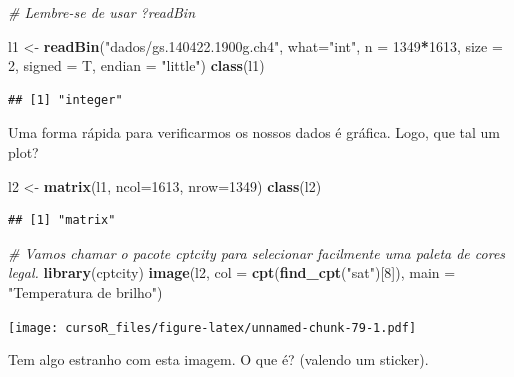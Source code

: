 \documentclass[]{book}
\newenvironment{Shaded}{\begin{snugshade}}{\end{snugshade}}
\newcommand{\KeywordTok}[1]{\textcolor[rgb]{0.13,0.29,0.53}{\textbf{#1}}}
\newcommand{\DataTypeTok}[1]{\textcolor[rgb]{0.13,0.29,0.53}{#1}}
\newcommand{\DecValTok}[1]{\textcolor[rgb]{0.00,0.00,0.81}{#1}}
\newcommand{\StringTok}[1]{\textcolor[rgb]{0.31,0.60,0.02}{#1}}
\newcommand{\CommentTok}[1]{\textcolor[rgb]{0.56,0.35,0.01}{\textit{#1}}}
\newcommand{\OperatorTok}[1]{\textcolor[rgb]{0.81,0.36,0.00}{\textbf{#1}}}
\newcommand{\NormalTok}[1]{#1}
\theoremstyle{definition}
\theoremstyle{definition}
\theoremstyle{definition}
\theoremstyle{remark}
\begin{document}
\begin{Shaded}
\begin{Highlighting}[]
\CommentTok{# Lembre-se de usar ?readBin}

\NormalTok{l1 <-}\StringTok{ }\KeywordTok{readBin}\NormalTok{(}\StringTok{"dados/gs.140422.1900g.ch4"}\NormalTok{, }
              \DataTypeTok{what=}\StringTok{"int"}\NormalTok{, }
              \DataTypeTok{n =} \DecValTok{1349}\OperatorTok{*}\DecValTok{1613}\NormalTok{,}
              \DataTypeTok{size =} \DecValTok{2}\NormalTok{,}
              \DataTypeTok{signed =}\NormalTok{ T,}
              \DataTypeTok{endian =} \StringTok{"little"}\NormalTok{)}
\KeywordTok{class}\NormalTok{(l1)}
\end{Highlighting}
\end{Shaded}

\begin{verbatim}
## [1] "integer"
\end{verbatim}

Uma forma rápida para verificarmos os nossos dados é gráfica. Logo, que
tal um plot?

\begin{Shaded}
\begin{Highlighting}[]
\NormalTok{l2 <-}\StringTok{ }\KeywordTok{matrix}\NormalTok{(l1, }\DataTypeTok{ncol=}\DecValTok{1613}\NormalTok{, }\DataTypeTok{nrow=}\DecValTok{1349}\NormalTok{)}
\KeywordTok{class}\NormalTok{(l2)}
\end{Highlighting}
\end{Shaded}

\begin{verbatim}
## [1] "matrix"
\end{verbatim}

\begin{Shaded}
\begin{Highlighting}[]
\CommentTok{# Vamos chamar o pacote cptcity para selecionar facilmente uma paleta de cores legal.}
\KeywordTok{library}\NormalTok{(cptcity)   }
\KeywordTok{image}\NormalTok{(l2,}
      \DataTypeTok{col =} \KeywordTok{cpt}\NormalTok{(}\KeywordTok{find_cpt}\NormalTok{(}\StringTok{"sat"}\NormalTok{)[}\DecValTok{8}\NormalTok{]),}
      \DataTypeTok{main =} \StringTok{"Temperatura de brilho"}\NormalTok{) }
\end{Highlighting}
\end{Shaded}

\texttt{[image: cursoR\_files/figure-latex/unnamed-chunk-79-1.pdf]}

Tem algo estranho com esta imagem. O que é? (valendo um sticker).
\end{document}
